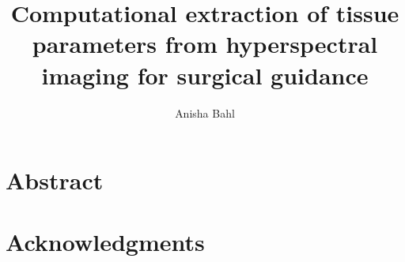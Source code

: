 \documentclass[british,a4paper,11pt,twoside]{StyleThese}
\title{Computational extraction of tissue parameters from hyperspectral imaging for surgical guidance}\let\thetitle\@title
\author{Anisha Bahl}\let\theauthor\@author
\begin{document}
\frontmatter


%

\dominitoc

\copyrightpage{\the\year}{\theauthor}
\declarationpage{\theauthor}

\cleardoublepage
\chapter{Abstract}



\cleardoublepage
\chapter{Acknowledgments}


\cleardoublepage
\tableofcontents

\clearpage
\listoftables
\clearpage
\listoffigures

\mainmatter













\backmatter



 
\end{document}
